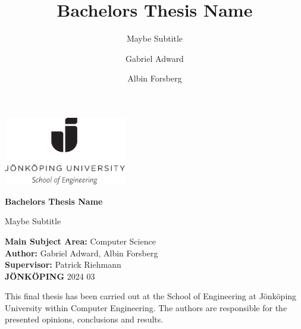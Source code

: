 \documentclass[bibliography=totocnumbered, 12pt]{scrreprt}
\title{Bachelors Thesis Name}
\subtitle{Maybe Subtitle}
\author{Gabriel Adward \and Albin Forsberg}
\begin{document}
\begin{titlepage}
        \includegraphics[width=0.4\textwidth]{./Images/ju.png}
        \vspace{2cm}
        
        \Huge
        \textbf{Bachelors Thesis Name}
        
        \vspace{0.5cm}
        \LARGE
        Maybe Subtitle
        
        \vfill
        \small
        \noindent
        \textbf{Main Subject Area:} Computer Science \\
        \textbf{Author:} Gabriel Adward, Albin Forsberg \\
        \textbf{Supervisor:} Patrick Riehmann \\
        \textbf{JÖNKÖPING} 2024 03

        \newpage
        \vfill 
        \small
        This final thesis has been carried out at the School of Engineering at Jönköping University within Computer Engineering. The authors are responsible for the presented opinions, conclusions and results.  

\end{titlepage}

\begin{abstract}
\end{abstract}

\tableofcontents









\cite{greenwade93}



\end{document}

